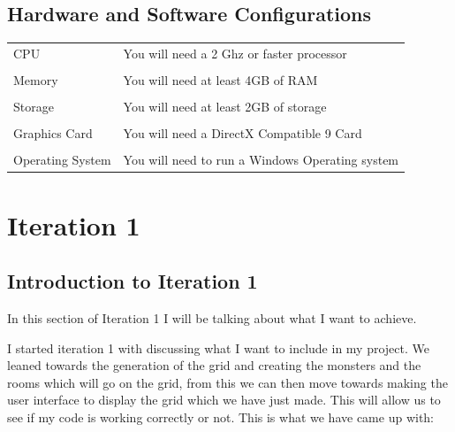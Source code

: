 \documentclass[12pt]{article}
\begin{document}
		\subsection{Hardware and Software Configurations}


\begin{tabularx}{\linewidth}{XX}
CPU              & You will need a 2 Ghz or faster processor       \\\\
Memory           & You will need at least 4GB of RAM               \\\\
Storage          & You will need at least 2GB of storage           \\\\
Graphics Card    & You will need a DirectX Compatible 9 Card       \\\\
Operating System & You will need to run a Windows Operating system
\end{tabularx}





\section{Iteration 1}

\subsection{Introduction to Iteration 1}

In this section of Iteration 1 I will be talking about what I want to achieve.

I started iteration 1 with discussing what I want to include in my project. We leaned towards the generation of the grid and creating the monsters and the rooms which will go on the grid, from this we can then move towards making the user interface to display the grid which we have just made. This will allow us to see if my code is working correctly or not. This is what we have came up with:
\end{document}
